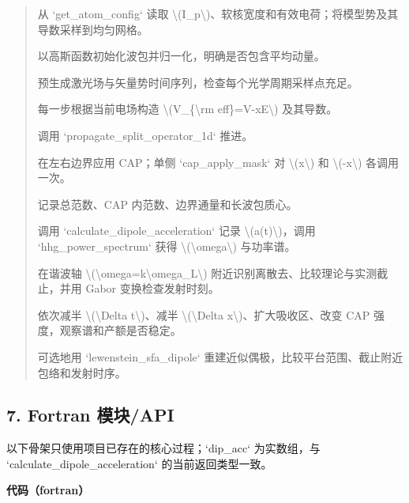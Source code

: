 \documentclass[UTF8,openany,11pt,fontset=fandol]{ctexbook}
\begin{document}
\begin{quote}
从 `get\_atom\_config` 读取
\textbackslash(I\_p\textbackslash)、软核宽度和有效电荷；将模型势及其导数采样到均匀网格。

以高斯函数初始化波包并归一化，明确是否包含平均动量。

预生成激光场与矢量势时间序列，检查每个光学周期采样点充足。

每一步根据当前电场构造 \textbackslash(V\_\{\textbackslash rm
eff\}=V-xE\textbackslash) 及其导数。

调用 `propagate\_split\_operator\_1d` 推进。

在左右边界应用 CAP；单侧 `cap\_apply\_mask` 对
\textbackslash(x\textbackslash) 和 \textbackslash(-x\textbackslash)
各调用一次。

记录总范数、CAP 内范数、边界通量和长波包质心。

调用 `calculate\_dipole\_acceleration` 记录
\textbackslash(a(t)\textbackslash)，调用 `hhg\_power\_spectrum` 获得
\textbackslash(\textbackslash omega\textbackslash) 与功率谱。

在谐波轴
\textbackslash(\textbackslash omega=k\textbackslash omega\_L\textbackslash)
附近识别离散去、比较理论与实测截止，并用 Gabor 变换检查发射时刻。

依次减半 \textbackslash(\textbackslash Delta t\textbackslash)、减半
\textbackslash(\textbackslash Delta x\textbackslash)、扩大吸收区、改变
CAP 强度，观察谱和产额是否稳定。

可选地用 `lewenstein\_sfa\_dipole`
重建近似偶极，比较平台范围、截止附近包络和发射时序。
\end{quote}

\subsection{\texorpdfstring{\textbf{7. Fortran
模块/API}}{7. Fortran 模块/API}}\label{fortran-ux6a21ux5757api-1}

以下骨架只使用项目已存在的核心过程；`dip\_acc` 为实数组，与
`calculate\_dipole\_acceleration` 的当前返回类型一致。

\textbf{代码（fortran）}
\end{document}
